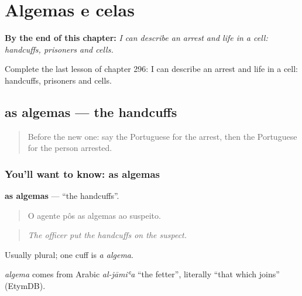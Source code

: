 
\chapter{Algemas e celas}
\label{ch:pt-algemas-e-celas}

\begin{chapteropening}
\textbf{By the end of this chapter:} \emph{I can describe an arrest and life in a cell: handcuffs, prisoners and cells.}

Complete the last lesson of chapter 296: I can describe an arrest and life in a cell: handcuffs, prisoners and cells.
\end{chapteropening}

\section[as algemas]{as algemas — the handcuffs}

\label{lesson:PT-C296-algemas}



\begin{quote}
Before the new one: say the Portuguese for the arrest, then the Portuguese for the person arrested.
\end{quote}

\subsection*{You'll want to know: as algemas}
\textbf{as algemas} — \textquotedblleft{}the handcuffs\textquotedblright{}.

\begin{quote}
O agente pôs as algemas ao suspeito.
\end{quote}

\begin{quote}
\emph{The officer put the handcuffs on the suspect.}
\end{quote}

Usually plural; one cuff is \emph{a algema}.

\begin{cousinweb}
\emph{algema} comes from Arabic \emph{al-jāmiʿa} \textquotedblleft{}the fetter\textquotedblright{}, literally \textquotedblleft{}that which joins\textquotedblright{} (EtymDB).
\end{cousinweb}

